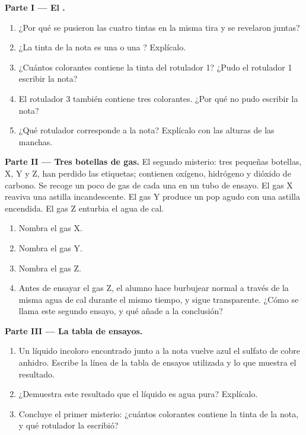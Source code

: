 \begin{problem}
\medskip
\noindent\textbf{Parte I --- El .}
\begin{enumerate}
  \item ¿Por qué se pusieron las cuatro tintas en la misma tira y se
        revelaron juntas?
  \item ¿La tinta de la nota es una  o una ?
        Explícalo.
  \item ¿Cuántos colorantes contiene la tinta del rotulador 1? ¿Pudo el
        rotulador 1 escribir la nota?
  \item El rotulador 3 también contiene tres colorantes. ¿Por qué no pudo
        escribir la nota?
  \item ¿Qué rotulador corresponde a la nota? Explícalo con las alturas
        de las manchas.
\end{enumerate}

\medskip
\noindent\textbf{Parte II --- Tres botellas de gas.}
El segundo misterio: tres pequeñas botellas, X, Y y Z, han perdido las
etiquetas; contienen oxígeno, hidrógeno y dióxido de carbono. Se recoge
un poco de gas de cada una en un tubo de ensayo. El gas X reaviva una
astilla incandescente. El gas Y produce un pop agudo con una astilla
encendida. El gas Z enturbia el agua de cal.
\begin{enumerate}[resume]
  \item Nombra el gas X.
  \item Nombra el gas Y.
  \item Nombra el gas Z.
  \item Antes de ensayar el gas Z, el alumno hace burbujear  normal
        a través de la misma agua de cal durante el mismo tiempo, y
        sigue transparente. ¿Cómo se llama este segundo ensayo, y qué
        añade a la conclusión?
\end{enumerate}

\medskip
\noindent\textbf{Parte III --- La tabla de ensayos.}
\begin{enumerate}[resume]
  \item Un líquido incoloro encontrado junto a la nota vuelve azul el
        sulfato de cobre anhidro. Escribe la línea de la tabla de
        ensayos utilizada y lo que muestra el resultado.
  \item ¿Demuestra este resultado que el líquido es agua pura?
        Explícalo.
  \item Concluye el primer misterio: ¿cuántos colorantes contiene la
        tinta de la nota, y qué rotulador la escribió?
\end{enumerate}
\end{problem}
